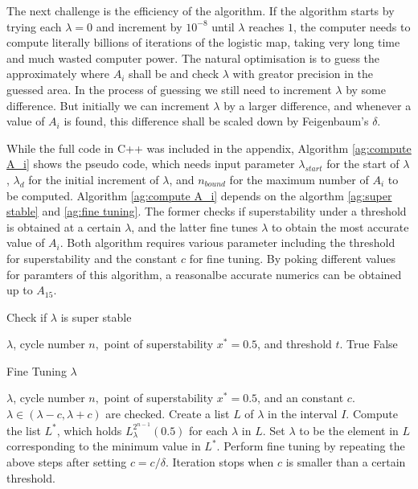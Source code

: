 The next challenge is the efficiency of the algorithm. 
If the algorithm starts by trying each $\lambda = 0$ and increment by $10^{-8}$ until $\lambda$ reaches $1$, the computer needs to compute literally billions of iterations of the logistic map, taking very long time and much wasted computer power.
The natural optimisation is to guess the approximately where $A_i$ shall be and check $\lambda$ with greator precision in the guessed area. 
In the process of guessing we still need to increment $\lambda$ by some difference.
But initially we can increment $\lambda$ by a larger difference, and whenever a value of $A_i$ is found, this difference shall be scaled down by Feigenbaum's  $\delta$.


While the full code in C++ was included in the appendix,
Algorithm \ref{ag:compute A_i} shows the pseudo code, which needs input parameter $\lambda_{start}$ for the start of $\lambda$, $\lambda_d$ for the initial increment of $\lambda$, and $n_{bound}$ for the maximum number of $A_i$ to be computed.
Algorithm \ref{ag:compute A_i} depends on the algorthm \ref{ag:super stable} and \ref{ag:fine tuning}. 
The former checks if superstability under a threshold is obtained at a certain $\lambda$, and the latter fine tunes $\lambda$ to obtain the most accurate value of $A_i$.
Both algorithm requires various parameter including the threshold for superstability and the constant $c$ for fine tuning.
By poking different values for paramters of this algorithm, a reasonalbe accurate numerics can be obtained up to $A_{15}$.


\begin{algorithm}
	\caption{Check if $\lambda$ is super stable}
	\begin{algorithmic}[1]
		\State $\lambda$, cycle number $n,$ point of superstability $x^* = 0.5$, and threshold $t$.
		\State \Return True
		\Else
		\State \Return False
		\EndIf
	\end{algorithmic}
	\label{ag:super stable}
\end{algorithm}

\begin{algorithm}
	\caption{Fine Tuning $\lambda$}
	\begin{algorithmic}[1]
		\State $\lambda$, cycle number $n,$ point of superstability $x^* = 0.5$, and an constant $c$. $\lambda \in (\lambda - c, \lambda +c)$ are checked.
		\State Create a list $L$ of $\lambda$ in the interval $I$.
		\State Compute the list $L^*$, which holds $L_{\lambda}^{2^{n-1}}(0.5)$ for each $\lambda$ in $L$.
		\State Set $\lambda$ to be the element in $L$ corresponding to the minimum value in $L^*$.
		\State Perform fine tuning by repeating the above steps after setting $c = c / \delta$. 
		\State Iteration stops when $c$ is smaller than a certain threshold.
	\end{algorithmic}
	\label{ag:fine tuning}
\end{algorithm}

